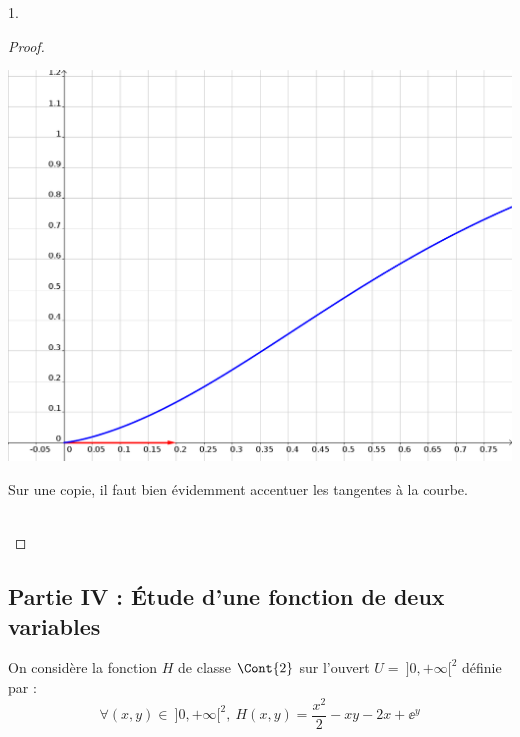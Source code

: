 \begin{noliste}{1.}
\begin{proof}
\begin{remark}
\begin{center}
\includegraphics[scale=1]{Figures/EML_2018/geogebra_EML_2018_zoom.png}
      \end{center}
      Sur une copie, il faut bien évidemment accentuer les tangentes 
      à la courbe.
    \end{remark}~\\[-1.4cm]
  \end{proof}
\end{noliste}


\newpage


\subsection*{Partie IV : Étude d'une fonction de deux variables}

\noindent
On considère la fonction $H$ de classe $\Cont{2}$ sur l'ouvert $U = \
]0,+\infty[^2$ définie par :
\[
  \forall (x,y) \in \ ]0,+\infty[^2, \ H(x,y) = \dfrac{x^2}{2} -xy-2x 
  + \ee^y
\]


